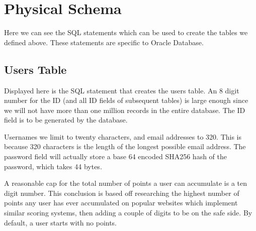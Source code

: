 \section{Physical Schema}

Here we can see the SQL statements which can be used to create the tables we defined above. These statements are specific to Oracle Database.

\subsection{Users Table}

Displayed here is the SQL statement that creates the users table. An 8 digit number for the ID (and all ID fields of subsequent tables) is large enough since we will not have more than one million records in the entire database. The ID field is to be generated by the database.

Usernames we limit to twenty characters, and email addresses to 320. This is because 320 characters is the length of the longest possible email address. The password field will actually store a base 64 encoded SHA256 hash of the password, which takes 44 bytes.

A reasonable cap for the total number of points a user can accumulate is a ten digit number. This conclusion is based off researching the highest number of points any user has ever accumulated on popular websites which implement similar scoring systems, then adding a couple of digits to be on the safe side. By default, a user starts with no points.

